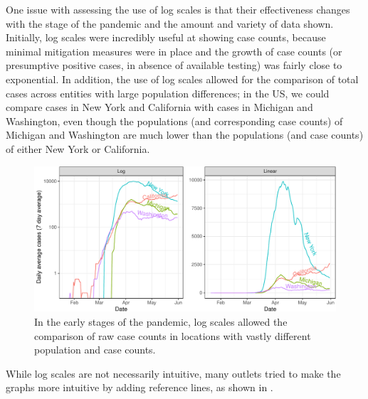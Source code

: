 \documentclass[article]{jdssv}\usepackage[]{graphicx}\usepackage[]{color}
\newenvironment{knitrout}{}{} %
\begin{document}
One issue with assessing the use of log scales is that their effectiveness changes with the stage of the pandemic and the amount and variety of data shown. Initially, log scales were incredibly useful at showing case counts, because minimal mitigation measures were in place and the growth of case counts (or presumptive positive cases, in absence of available testing) was fairly close to exponential. In addition, the use of log scales allowed for the comparison of total cases across entities with large population differences; in the US, we could compare cases in New York and California with cases in Michigan and Washington, even though the populations (and corresponding case counts) of Michigan and Washington are much lower than the populations (and case counts) of either New York or California. 

\begin{knitrout}\footnotesize
{}\color{fgcolor}\begin{figure}

{\centering \includegraphics[width=\linewidth]{Figures_R/fig-log-scale-initial-1} 

}

\caption[In the early stages of the pandemic, log scales allowed the comparison of raw case counts in locations with vastly different population and case counts]{In the early stages of the pandemic, log scales allowed the comparison of raw case counts in locations with vastly different population and case counts.}\label{fig:log-scale-initial}
\end{figure}

\end{knitrout}

While log scales are not necessarily intuitive, many outlets tried to make the graphs more intuitive by adding reference lines, as shown in . 
\end{document}
